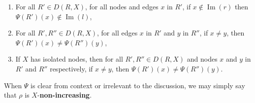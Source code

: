 \begin{definition}
\begin{enumerate}
\begin{center}
        \end{center}
        \item \label{def:non_increasing:non_clapse} For all $R' \mathop{\in} D(R,X)$, for all nodes and edges $x$ in $R'$, if $ x \notin \operatorname{Im}(r)$ then 
        $\Psi(R')(x) \notin \operatorname{Im}(l)$,
        \item \label{def:non_increasing_rule_img_edges_distinct} For all $R',R'' \mathop{\in} D(R,X)$, for all edges $x$ in $R'$ and $y$ in $R''$, if $x \mathop{\neq} y$, then $\Psi(R')(x) \mathop{\neq} \Psi(R'')(y)$,
        \item If $X$ has isolated nodes, then for all $R',R'' \mathop{\in} D(R,X)$ and nodes $x$ and $y$ in $R'$ and $R''$ respectively, if $x \mathop{\neq} y$, then $\Psi(R')(x) \mathop{\neq} \Psi(R'')(y)$.
    \end{enumerate} 
    When $\Psi$ is clear from context or irrelevant to the discussion, we may simply say that $\rho$ is $X$-\textbf{non-increasing}.
\end{definition}
